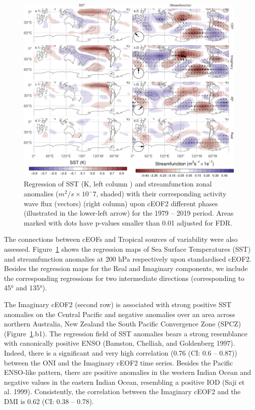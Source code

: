 \documentclass[smallextended]{svjour3}       %
\begin{document}
\begin{figure}
\includegraphics{../figures/sst-psi-2-1} \caption{Regression of SST (K, left column ) and streamfunction zonal anomalies (\(m^2/s\times10^-7\), shaded) with their corresponding activity wave flux (vectors) (right column) upon cEOF2 different phases (illustrated in the lower-left arrow) for the 1979 -- 2019 period. Areas marked with dots have p-values smaller than 0.01 adjusted for FDR.}\label{fig:sst-psi-2}
\end{figure}



The connections between cEOFs and Tropical sources of variability were also assessed.
Figure~\ref{fig:sst-psi-2} shows the regression maps of Sea Surface Temperatures (SST) and streamfunction anomalies at 200 hPa respectively upon standardised cEOF2.
Besides the regression maps for the Real and Imaginary components, we include the corresponding regressions for two intermediate directions (corresponding to 45° and 135°).

The Imaginary cEOF2 (second row) is associated with strong positive SST anomalies on the Central Pacific and negative anomalies over an area across northern Australia, New Zealand the South Pacific Convergence Zone (SPCZ) (Figure~\ref{fig:sst-psi-2}.b1).
The regression field of SST anomalies bears a strong resemblance with canonically positive ENSO (Bamston, Chelliah, and Goldenberg 1997).
Indeed, there is a significant and very high correlation (0.76 (CI: 0.6 -- 0.87)) between the ONI and the Imaginary cEOF2 time series.
Besides the Pacific ENSO-like pattern, there are positive anomalies in the western Indian Ocean and negative values in the eastern Indian Ocean, resembling a positive IOD (Saji et al. 1999).
Consistently, the correlation between the Imaginary cEOF2 and the DMI is 0.62 (CI: 0.38 -- 0.78).
\end{document}
